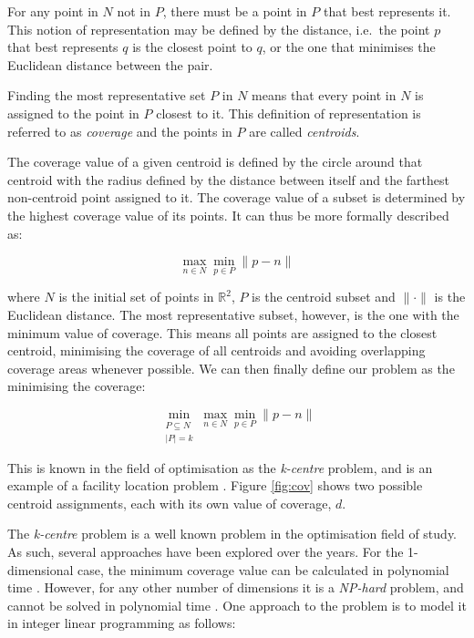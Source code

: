 For any point in $N$ not in $P$, there must be a point in $P$ that best represents it. This notion of representation may be defined by the distance, i.e.\ the point $p$ that best represents $q$ is the closest point to $q$, or the one that minimises the Euclidean distance between the pair.

Finding the most representative set $P$ in $N$ means that every point in $N$ is assigned to the point in $P$ closest to it. This definition of representation is referred to as \emph{coverage} and the points in $P$ are called \emph{centroids}.

The coverage value of a given centroid is defined by the circle around that centroid with the radius defined by the distance between itself and the farthest non-centroid point assigned to it. The coverage value of a subset is determined by the highest coverage value of its points. It can thus be more formally described as:

\begin{equation}
\max_{n \in N}
	{\min_{p \in P}
		{\lVert p-n \rVert}
	}
\end{equation}

\noindent
where $N$ is the initial set of points in $\mathbb{R}^2$, $P$ is the centroid subset and $\lVert \cdot \rVert $ is the Euclidean distance.
The most representative subset, however, is the one with the minimum value of coverage. This means all points are assigned to the closest centroid, minimising the coverage of all centroids and avoiding overlapping coverage areas whenever possible.
We can then finally define our problem as the minimising the coverage:

\begin{equation}
\min_{\substack{P \subseteq N\\ \lvert P \rvert = k}}{\max_{n \in N}{\min_{p \in P}{\lVert p-n \rVert}}}
\end{equation}

This is known in the field of optimisation as the \emph{k-centre} problem, and is an example of a facility location problem \cite{thisfref}. Figure \ref{fig:cov} shows two possible centroid assignments, each with its own value of coverage, $d$.



The \emph{k-centre} problem is a well known problem in the optimisation field of study. As such, several approaches have been explored over the years. For the 1-dimensional case, the minimum coverage value can be calculated in polynomial time \cite{dvaz}. However, for any other number of dimensions it is a \emph{NP-hard} problem, and cannot be solved in polynomial time \cite{complex}. One approach to the problem is to model it in  integer linear programming as follows:

